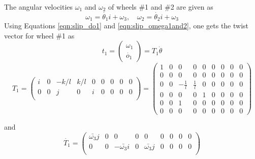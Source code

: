 {The angular velocities $\omega_1$ and $\omega_2$ of wheels \#1 and \#2 are given as
\begin{equation}
\label{eqn:slip_omega1and2}
\omega_1=\dot{\theta_1}i+\omega_3, \quad \omega_2=\dot{\theta_2}i+\omega_3
\end{equation}
Using Equations \ref{eqn:slip_do1} and \ref{eqn:slip_omega1and2}, one gets the twist vector for wheel \#1 as 
\begin{equation}
\label{eqn:slip_t1}
t_1=
\begin{pmatrix}
\omega_1\\
\dot{o_1}
\end{pmatrix}=T_1 \dot{\theta}
\end{equation} 
\begin{equation}
\label{eqn:slip_T1}
T_1=
\begin{pmatrix}
i & 0& -k/l & k/l & 0 &0 & 0 &0 &0\\
0 & 0& j& 0 & i &0 & 0 &0 &0\\ 
\end{pmatrix}=
\left(
\begin{array}{ccccccccc}
1 & 0 & 0 & 0 & 0 & 0 & 0 & 0 & 0 \\
0 & 0 & 0 & 0 & 0 & 0 & 0 & 0 & 0 \\
0 & 0 & -\frac{1}{l} & \frac{1}{l} & 0 & 0 & 0 & 0 & 0 \\
0 & 0 & 0 & 0 & 1 & 0 & 0 & 0 & 0 \\
0 & 0 & 1 & 0 & 0 & 0 & 0 & 0 & 0 \\
0 & 0 & 0 & 0 & 0 & 0 & 0 & 0 & 0
\end{array}
\right)
\end{equation}

and 
\begin{equation}
\label{eqn:slip_dT1}
\dot{T_1}=\begin{pmatrix}
\bar{\omega_3}j & 0& 0& 0 & 0 &0 & 0 &0 &0\\
0 & 0& -\bar{\omega_3}i& 0 & \bar{\omega_3}j &0 & 0 &0 &0\\ 
\end{pmatrix}
\end{equation}

}
